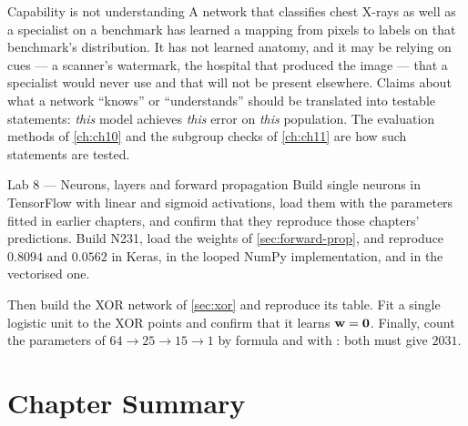 \begin{ethicsnote}{Capability is not understanding}
A network that classifies chest X-rays as well as a specialist on a benchmark
has learned a mapping from pixels to labels on that benchmark's distribution. It
has not learned anatomy, and it may be relying on cues --- a scanner's
watermark, the hospital that produced the image --- that a specialist would never
use and that will not be present elsewhere. Claims about what a network
``knows'' or ``understands'' should be translated into testable statements:
\emph{this} model achieves \emph{this} error on \emph{this} population. The
evaluation methods of \cref{ch:ch10} and the subgroup checks of \cref{ch:ch11}
are how such statements are tested.
\end{ethicsnote}

\begin{labbox}{Lab 8 --- Neurons, layers and forward propagation}
Build single neurons in TensorFlow with linear and sigmoid activations, load
them with the parameters fitted in earlier chapters, and confirm that they
reproduce those chapters' predictions. Build N231, load the weights of
\cref{sec:forward-prop}, and reproduce $0.8094$ and $0.0562$ in Keras, in the
looped NumPy implementation, and in the vectorised one.

Then build the XOR network of \cref{sec:xor} and reproduce its table. Fit a
single logistic unit to the XOR points and confirm that it learns $\mathbf{w} =
\mathbf{0}$. Finally, count the parameters of $64\to25\to15\to1$ by formula and
with : both must give $2031$.
\end{labbox}

\section*{Chapter Summary}

